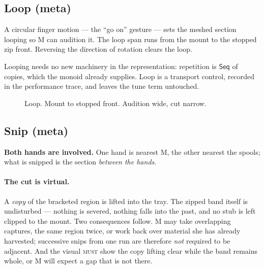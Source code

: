 \documentclass[11pt,a4paper]{article}
\newcommand{\MUST}{\textsc{must}}
\theoremstyle{definition}
\theoremstyle{plain}
\theoremstyle{remark}
\newcommand{\spools}{%
  \fill[ribL,opacity=.45,rounded corners=2pt] (1.55,5.40) rectangle (2.45,5.95);
  \fill[ribR,opacity=.45,rounded corners=2pt] (5.55,5.40) rectangle (6.45,5.95);
  \node[font=\scriptsize] at (2,6.22) {left spool};
  \node[font=\scriptsize] at (6,6.22) {right spool};
}
\newcommand{\musician}{%
  \draw[gray] (4,-0.10) circle (0.23);
  \node[font=\scriptsize] at (4,-0.10) {M};
}
\newcommand{\axes}{%
  \draw[->,gray,thin] (0.85,4.30) -- (1.45,4.30) node[right,font=\scriptsize]{$x$};
  \draw[->,gray,thin] (0.85,4.30) -- (0.85,4.90) node[above,font=\scriptsize]{$z$};
}
\newcommand{\ribbonszipped}{%
  \draw[ribL,opacity=.45,line width=16pt,line join=round]
    (2,5.40) -- (2,4.60) -- (3.72,4.20) -- (3.72,2.20) -- (3.10,1.70) -- (3.10,0.70);
  \draw[ribR,opacity=.45,line width=16pt,line join=round]
    (6,5.40) -- (6,4.60) -- (4.28,4.20) -- (4.28,2.20) -- (4.90,1.70) -- (4.90,0.70);
}
\newcommand{\mesh}[2]{%
  \draw[gray!75,decorate,decoration={zigzag,segment length=5pt,amplitude=3pt}]
    (4,#1) -- (4,#2);
}
\newcommand{\mountclips}{%
  \fill[amb,opacity=.75,rounded corners=1pt] (3.76,1.05) rectangle (3.92,1.45);
  \fill[amb,opacity=.75,rounded corners=1pt] (4.08,1.05) rectangle (4.24,1.45);
}
\newcommand{\handat}[2]{\filldraw[fill=white,draw=gray!80,thin] (#1,#2) circle (0.17);}
\newcommand{\handsdefault}{\handat{3.10}{0.55}\handat{4.90}{0.55}}
\begin{document}
\subsection{Loop \normalfont(meta)}

A circular finger motion --- the ``go on'' gesture --- sets the meshed section looping so M can
audition it. The loop span runs from the mount to the stopped zip front. Reversing the direction of
rotation clears the loop.

Looping needs no new machinery in the representation: repetition is $\mathsf{Seq}$ of copies, which
the monoid already supplies. Loop is a transport control, recorded in the performance trace, and
leaves the tune term untouched.

\begin{figure}[H]\centering
{}
\caption{Loop. Mount to stopped front. Audition wide, cut narrow.}
\end{figure}

\subsection{Snip \normalfont(meta)}

\textbf{Both hands are involved.} One hand is nearest M, the other nearest the spools; what is
snipped is the section \emph{between the hands}.

\paragraph{The cut is virtual.} A \emph{copy} of the bracketed region is lifted into the tray. The
zipped band itself is undisturbed --- nothing is severed, nothing falls into the past, and no stub
is left clipped to the mount. Two consequences follow. M may take overlapping captures, the same
region twice, or work back over material she has already harvested; successive snips from one run
are therefore \emph{not} required to be adjacent. And the visual \MUST{} show the copy lifting
clear while the band remains whole, or M will expect a gap that is not there.
\end{document}

